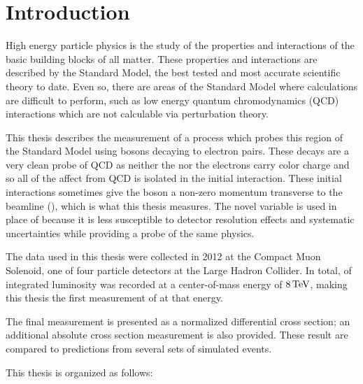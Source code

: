 \chapter{Introduction}
\label{chapter:intro}

High energy particle physics is the study of the properties and interactions of
the basic building blocks of all matter. These properties and interactions are
described by the Standard Model, the best tested and most accurate scientific
theory to date. Even so, there are areas of the Standard Model where
calculations are difficult to perform, such as low energy quantum
chromodynamics (QCD) interactions which are not calculable via perturbation
theory.

This thesis describes the measurement of a process which probes this region of
the Standard Model using \Z bosons decaying to electron pairs. These decays are
a very clean probe of QCD as neither the \Z nor the electrons carry color
charge and so all of the affect from QCD is isolated in the initial
interaction. These initial interactions sometimes give the \Z boson a non-zero
momentum transverse to the beamline (\bosonpt), which is what this thesis
measures. The novel variable \phistar is used in place of \bosonpt because it
is less susceptible to detector resolution effects and systematic uncertainties
while providing a probe of the same physics.

The data used in this thesis were collected in 2012 at the Compact Muon
Solenoid, one of four particle detectors at the Large Hadron Collider. In
total, \GoodLumiNumber of integrated luminosity was recorded at a
center-of-mass energy of $8 \,\text{Te\hspace{-.08em}V}$, making this thesis the first measurement of
\phistar at that energy.

The final measurement is presented as a normalized differential cross section;
an additional absolute cross section measurement is also provided. These result
are compared to predictions from several sets of simulated events.

This thesis is organized as follows:

